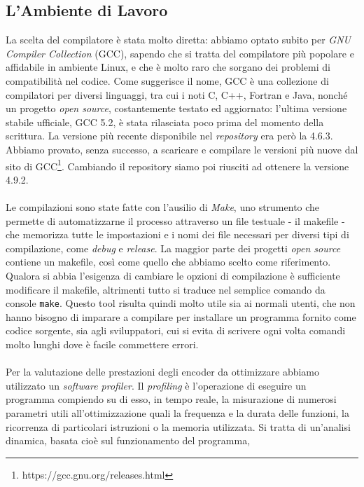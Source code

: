 \subsection{L'Ambiente di Lavoro}
La scelta del compilatore è stata molto diretta: abbiamo 
optato subito per 
\emph{GNU Compiler Collection} (GCC), sapendo che si tratta del compilatore più 
popolare e affidabile in ambiente Linux, e che è molto raro che sorgano dei 
problemi di compatibilità nel codice. Come suggerisce il nome, GCC è una 
collezione di compilatori per diversi linguaggi, tra cui i noti C, C++, Fortran 
e Java, nonché un progetto \emph{open source}, costantemente testato ed 
aggiornato: 
l'ultima versione stabile ufficiale, GCC 5.2, è stata rilasciata poco prima 
del momento della scrittura. La versione più recente disponibile nel 
\emph{repository} era però la 4.6.3. Abbiamo provato, senza successo, a 
scaricare e compilare le versioni più nuove dal sito di 
GCC\footnote{https://gcc.gnu.org/releases.html}. Cambiando il repository siamo 
poi riusciti ad ottenere la versione 4.9.2.
\\ \\
Le compilazioni sono state fatte con l'ausilio di \emph{Make}, 
uno strumento 
che permette di automatizzarne il processo attraverso un file 
testuale - il makefile - che memorizza tutte le impostazioni e i nomi dei file 
necessari per diversi tipi di compilazione, come \emph{debug} e \emph{release}. 
La maggior 
parte dei progetti \emph{open source} contiene un makefile, così come quello 
che 
abbiamo scelto come riferimento. Qualora si abbia l'esigenza di cambiare le 
opzioni di 
compilazione è sufficiente modificare il makefile, altrimenti tutto si traduce 
nel semplice comando da console \verb|make|. Questo tool risulta quindi molto 
utile sia ai normali utenti, che non hanno bisogno di imparare a compilare per 
installare un 
programma fornito come codice sorgente, sia agli sviluppatori, cui 
si evita di scrivere ogni volta 
comandi molto lunghi dove è facile commettere errori.
\\ \\
Per la valutazione delle prestazioni degli encoder da ottimizzare abbiamo 
utilizzato un \emph{software profiler}.
Il \emph{profiling} è l'operazione di eseguire un programma compiendo su di 
esso, in tempo reale, la misurazione di numerosi parametri utili 
all'ottimizzazione quali la frequenza e la durata delle  
funzioni, la ricorrenza di particolari istruzioni o la memoria utilizzata.
Si tratta di un'analisi dinamica, basata cioè sul funzionamento del programma, 
